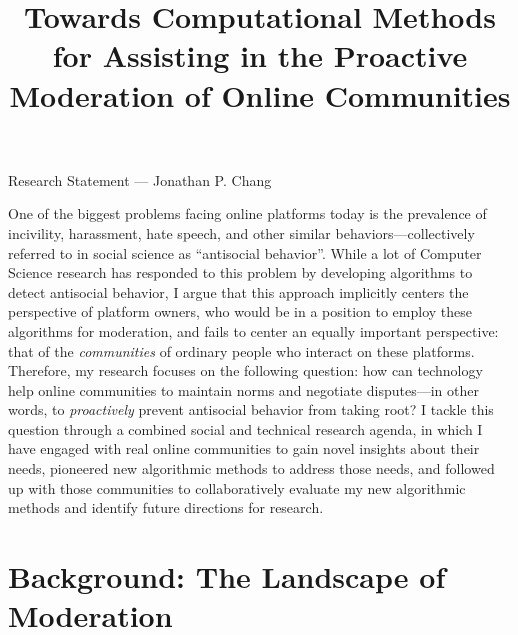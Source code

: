\documentclass[12pt,letterpaper]{article}
\title{Towards Computational Methods for Assisting in the Proactive Moderation of Online Communities}
\newcommand\introclosing\laresearchintro
\newcommand\introclosing\genresearchintro
\begin{document}
\maketitle

{\centering Research Statement --- Jonathan P. Chang \par}

\vspace{0.5\baselineskip}
One of the biggest problems facing online platforms today is the prevalence of incivility, harassment, hate speech, and other similar behaviors---collectively referred to in social science as ``antisocial behavior''.
While a lot of Computer Science research has responded to this problem by developing algorithms to detect antisocial behavior, I argue that this approach implicitly centers the perspective of platform owners, who would be in a position to employ these algorithms for moderation, and fails to center an equally important perspective: that of the \emph{communities} of ordinary people who interact on these platforms.
Therefore, my research focuses on the following question: how can technology help online communities to maintain norms and negotiate disputes---in other words, to \emph{proactively} prevent antisocial behavior from taking root?
I tackle this question through a combined social and technical research agenda, in which I have engaged with real online communities to gain novel insights about their needs, pioneered new algorithmic methods to address those needs, and followed up with those communities to collaboratively evaluate my new algorithmic methods and identify future directions for research.
\introclosing

\section{Background: The Landscape of Moderation}
\end{document}
